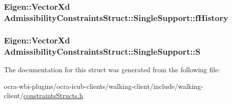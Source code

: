 \hypertarget{structAdmissibilityConstraintsStruct_1_1SingleSupport_ad907835e70c7e9c335435b11e733f34d}{
\subsubsection[{f\-History}]{\setlength{\rightskip}{0pt plus 5cm}\-Eigen\-::\-Vector\-Xd {\bf \-Admissibility\-Constraints\-Struct\-::\-Single\-Support\-::f\-History}}}\label{structAdmissibilityConstraintsStruct_1_1SingleSupport_ad907835e70c7e9c335435b11e733f34d}
\hypertarget{structAdmissibilityConstraintsStruct_1_1SingleSupport_aff9e7430c1d0bb3b5442bda53bb9c842}{
\subsubsection[{\-S}]{\setlength{\rightskip}{0pt plus 5cm}\-Eigen\-::\-Vector\-Xd {\bf \-Admissibility\-Constraints\-Struct\-::\-Single\-Support\-::\-S}}}\label{structAdmissibilityConstraintsStruct_1_1SingleSupport_aff9e7430c1d0bb3b5442bda53bb9c842}


\-The documentation for this struct was generated from the following file\-:\begin{DoxyCompactItemize}
\item 
ocra-\/wbi-\/plugins/ocra-\/icub-\/clients/walking-\/client/include/walking-\/client/\hyperlink{constraintsStructs_8h}{constraints\-Structs.\-h}\end{DoxyCompactItemize}
